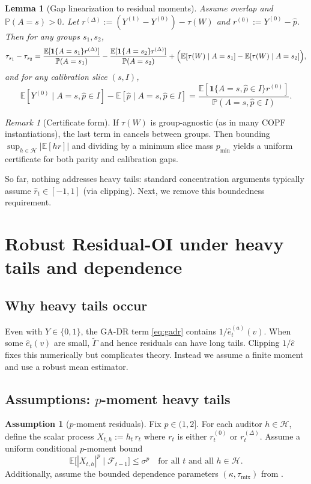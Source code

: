\documentclass[11pt]{article}
\newcommand{\E}{\mathbb{E}}
\newcommand{\Pp}{\mathbb{P}}
\newcommand{\1}{\mathbf{1}}
\newcommand{\cH}{\mathcal{H}}
\newcommand{\cF}{\mathcal{F}}
\newcommand{\abs}[1]{\left|#1\right|}
\newcommand{\tGADR}{\widetilde{\Gamma}}
\theoremstyle{plain}
\newtheorem{lemma}[theorem]{Lemma}
\theoremstyle{definition}
\newtheorem{assumption}[theorem]{Assumption}
\theoremstyle{remark}
\newtheorem{remark}[theorem]{Remark}
\begin{document}
\begin{lemma}[Gap linearization to residual moments]\label{lem:linearize}
Assume overlap and $\Pp(A=s)>0$.
Let $r^{(\Delta)}:=(Y^{(1)}-Y^{(0)})-\tau(W)$ and $r^{(0)}:=Y^{(0)}-\hat p$.
Then for any groups $s_1,s_2$,
\[
\tau_{s_1}-\tau_{s_2}
= \frac{\E[\1\{A=s_1\}r^{(\Delta)}]}{\Pp(A=s_1)}
- \frac{\E[\1\{A=s_2\}r^{(\Delta)}]}{\Pp(A=s_2)}
+ \Bigl(\E[\tau(W)\mid A=s_1]-\E[\tau(W)\mid A=s_2]\Bigr),
\]
and for any calibration slice $(s,I)$,
\[
\E[Y^{(0)}\mid A=s,\hat p\in I]-\E[\hat p\mid A=s,\hat p\in I]
= \frac{\E[\1\{A=s,\hat p\in I\}r^{(0)}]}{\Pp(A=s,\hat p\in I)}.
\]
\end{lemma}

\begin{remark}[Certificate form]
If $\tau(W)$ is group-agnostic (as in many COPF instantiations),
the last term in  cancels between groups.
Then bounding $\sup_{h\in\cH}\abs{\E[h r]}$ and dividing by a minimum slice mass $p_{\min}$
yields a uniform certificate for both parity and calibration gaps.
\end{remark}

So far, nothing addresses heavy tails:
standard concentration arguments typically assume $\hat r_t\in[-1,1]$ (via clipping).
Next, we remove this boundedness requirement.

\section{Robust Residual-OI under heavy tails and dependence}
\label{sec:heavy}

\subsection{Why heavy tails occur}
Even with $Y\in\{0,1\}$, the GA-DR term \eqref{eq:gadr} contains $1/\hat e_t^{(a)}(v)$.
When some $\hat e_t(v)$ are small, $\tGADR$ and hence residuals can have long tails.
Clipping $1/\hat e$ fixes this numerically but complicates theory.
Instead we assume a finite moment and use a robust mean estimator.

\subsection{Assumptions: $p$-moment heavy tails}
\begin{assumption}[$p$-moment residuals]\label{ass:pmoment}
Fix $p\in(1,2]$.
For each auditor $h\in\cH$, define the scalar process
$X_{t,h}:=h_t\,r_t$ where $r_t$ is either $r_t^{(0)}$ or $r_t^{(\Delta)}$.
Assume a uniform conditional $p$-moment bound
\[
\E\bigl[\abs{X_{t,h}}^p\mid \cF_{t-1}\bigr] \le \sigma^p
\quad\text{for all }t\text{ and all }h\in\cH.
\]
Additionally, assume the bounded dependence parameters $(\kappa,\tau_{\mathrm{mix}})$ from .
\end{assumption}
\end{document}
